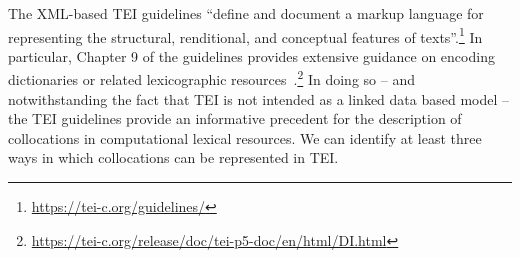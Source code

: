 \documentclass[output=paper,colorlinks,citecolor=brown]{langscibook}
\begin{document}
The XML-based TEI guidelines ``define and document a markup language for representing the structural, renditional, and conceptual features of texts''.\footnote{\url{https://tei-c.org/guidelines/}} In particular, Chapter 9 of the guidelines provides extensive guidance on encoding dictionaries or related lexicographic resources~\citep{tei-dict}.\footnote{\url{https://tei-c.org/release/doc/tei-p5-doc/en/html/DI.html}} In doing so  -- and notwithstanding the fact that TEI is not intended as a linked data based model -- the TEI guidelines provide an informative precedent for the description of collocations in computational lexical resources.
%
We can identify at least three ways in which collocations can be represented in TEI.
\end{document}
